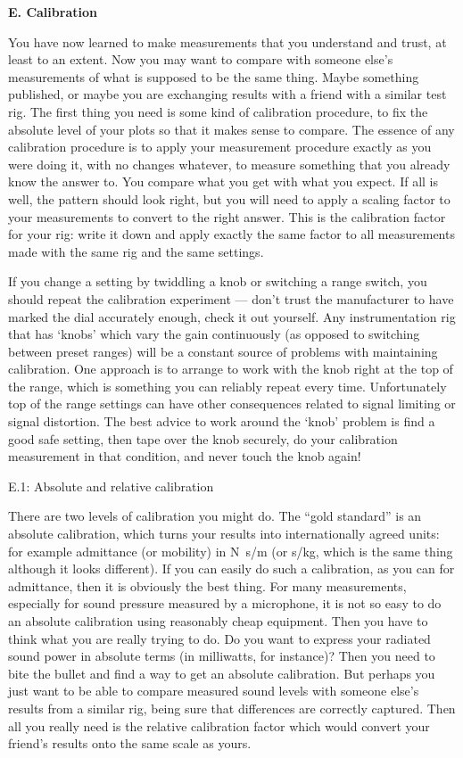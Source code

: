   \textbf{E. Calibration} 

  You have now learned to make measurements that you understand and trust, at 
  least to an extent. Now you may want to compare with someone else’s 
  measurements of what is supposed to be the same thing. Maybe something 
  published, or maybe you are exchanging results with a friend with a similar 
  test rig. The first thing you need is some kind of calibration procedure, to 
  fix the absolute level of your plots so that it makes sense to compare. The 
  essence of any calibration procedure is to apply your measurement procedure 
  exactly as you were doing it, with no changes whatever, to measure something 
  that you already know the answer to. You compare what you get with what you 
  expect. If all is well, the pattern should look right, but you will need to 
  apply a scaling factor to your measurements to convert to the right answer. 
  This is the calibration factor for your rig: write it down and apply exactly 
  the same factor to all measurements made with the same rig and the same 
  settings. 

  If you change a setting by twiddling a knob or switching a range switch, you 
  should repeat the calibration experiment — don’t trust the manufacturer to 
  have marked the dial accurately enough, check it out yourself. Any 
  instrumentation rig that has ‘knobs’ which vary the gain continuously (as 
  opposed to switching between preset ranges) will be a constant source of 
  problems with maintaining calibration. One approach is to arrange to work 
  with the knob right at the top of the range, which is something you can 
  reliably repeat every time. Unfortunately top of the range settings can have 
  other consequences related to signal limiting or signal distortion. The best 
  advice to work around the ‘knob’ problem is find a good safe setting, then 
  tape over the knob securely, do your calibration measurement in that 
  condition, and never touch the knob again! 

  E.1: Absolute and relative calibration 

  There are two levels of calibration you might do. The “gold standard” is an 
  absolute calibration, which turns your results into internationally agreed 
  units: for example admittance (or mobility) in N~s/m (or s/kg, which is the 
  same thing although it looks different). If you can easily do such a 
  calibration, as you can for admittance, then it is obviously the best thing. 
  For many measurements, especially for sound pressure measured by a 
  microphone, it is not so easy to do an absolute calibration using reasonably 
  cheap equipment. Then you have to think what you are really trying to do. Do 
  you want to express your radiated sound power in absolute terms (in 
  milliwatts, for instance)? Then you need to bite the bullet and find a way to 
  get an absolute calibration. But perhaps you just want to be able to compare 
  measured sound levels with someone else’s results from a similar rig, being 
  sure that differences are correctly captured. Then all you really need is the 
  relative calibration factor which would convert your friend’s results onto 
  the same scale as yours. 

